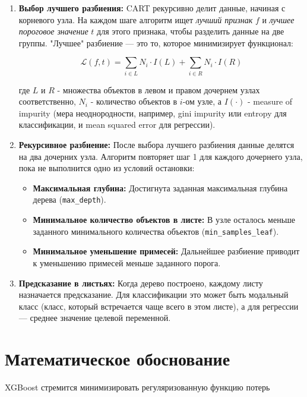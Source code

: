 \begin{enumerate}
    \item \textbf{Выбор лучшего разбиения:} CART рекурсивно делит данные, начиная с корневого узла. На каждом шаге алгоритм ищет \textit{лучший признак} $f$ и \textit{лучшее пороговое значение} $t$ для этого признака, чтобы разделить данные на две группы.  "Лучшее" разбиение — это то, которое минимизирует функционал:
    
    \[
        \mathcal{L}(f, t) = \sum_{i \in L} N_i \cdot I(L) + \sum_{i \in R} N_i \cdot I(R)
    \]
    
    где $L$ и $R$ - множества объектов в левом и правом дочернем узлах соответственно, $N_i$ - количество объектов в $i$-ом узле, а $I( \cdot )$ - measure of impurity (мера неоднородности, например, gini impurity или entropy для классификации, и mean squared error для регрессии).


    \item \textbf{Рекурсивное разбиение:}  После выбора лучшего разбиения данные делятся на два дочерних узла.  Алгоритм повторяет шаг 1 для каждого дочернего узла, пока не выполнится одно из условий остановки:

    \begin{itemize}
        \item \textbf{Максимальная глубина:} Достигнута заданная максимальная глубина дерева (\texttt{max\_depth}).
        \item \textbf{Минимальное количество объектов в листе:} В узле осталось меньше заданного минимального количества объектов (\texttt{min\_samples\_leaf}).
        \item \textbf{Минимальное уменьшение примесей:}  Дальнейшее разбиение приводит к уменьшению примесей меньше заданного порога.
    \end{itemize}

    \item \textbf{Предсказание в листьях:}  Когда дерево построено, каждому листу назначается предсказание.  Для классификации это может быть модальный класс (класс, который встречается чаще всего в этом листе), а для регрессии — среднее значение целевой переменной.
\end{enumerate}

\section{Математическое обоснование}
XGBoost стремится минимизировать регуляризованную функцию потерь

